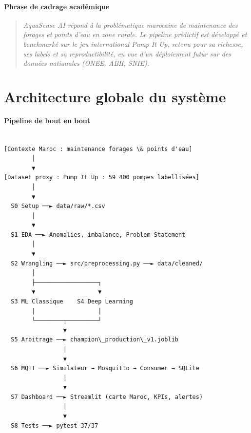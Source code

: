 \documentclass[11pt,a4paper]{report}
\begin{document}
\subsubsection{Phrase de cadrage académique}



\begin{quote}

\textit{AquaSense AI répond à la problématique marocaine de maintenance des forages et points d'eau en zone rurale. Le pipeline prédictif est développé et benchmarké sur le jeu international Pump It Up, retenu pour sa richesse, ses labels et sa reproductibilité, en vue d'un déploiement futur sur des données nationales (ONEE, ABH, SNIE).}

\end{quote}





\chapter{Architecture globale du système}



\subsubsection{Pipeline de bout en bout}



\begin{lstlisting}

[Contexte Maroc : maintenance forages \& points d'eau]
        │
        ▼
[Dataset proxy : Pump It Up : 59 400 pompes labellisées]
        │
        ▼
  S0 Setup ──► data/raw/*.csv
        │
        ▼
  S1 EDA ──► Anomalies, imbalance, Problem Statement
        │
        ▼
  S2 Wrangling ──► src/preprocessing.py ──► data/cleaned/
        │
        ├──────────────────┐
        ▼                  ▼
  S3 ML Classique    S4 Deep Learning
        │                  │
        └────────┬─────────┘
                 ▼
  S5 Arbitrage ──► champion\_production\_v1.joblib
                 │
                 ▼
  S6 MQTT ──► Simulateur → Mosquitto → Consumer → SQLite
                 │
                 ▼
  S7 Dashboard ──► Streamlit (carte Maroc, KPIs, alertes)
                 │
                 ▼
  S8 Tests ──► pytest 37/37

\end{lstlisting}
\end{document}
